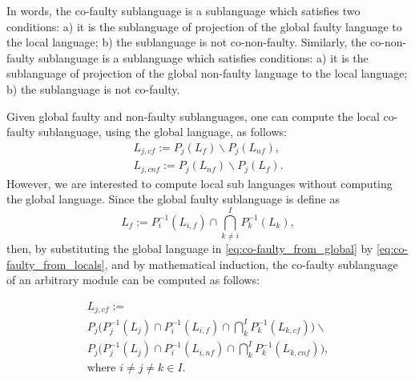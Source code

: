 In words, the co-faulty sublanguage is a sublanguage which satisfies two
conditions:
a) it is the sublanguage of projection of the global faulty language
to the local language; b) the sublanguage is not co-non-faulty.
Similarly, the co-non-faulty sublanguage is a sublanguage which satisfies
conditions:
a) it is the sublanguage of projection of the global non-faulty language
to the local language; b) the sublanguage is not co-faulty.


Given global faulty and non-faulty sublanguages, one can compute the local
co-faulty sublanguage, using the global language, as follows:
\begin{equation}
\label{eq:co-faulty_from_global}
	\begin{array}{l}
		L_{j,cf} := P_j(L_f) \backslash P_j(L_{nf}),\\ 
		L_{j,cnf} := P_j(L_{nf}) \backslash P_j(L_{f}).	
	\end{array}
\end{equation}
However, we are interested to compute local sub languages without computing the
global language. Since the global faulty sublanguage is define as
\begin{equation}
\label{eq:co-faulty_from_locals}
	L_f := P_i^{-1}(L_{i,f}) \cap \bigcap_{k\neq
	i}^I P_k^{-1}(L_k),
\end{equation}
then, by substituting the global language in \ref{eq:co-faulty_from_global} by
\ref{eq:co-faulty_from_locals}, and by mathematical induction, the co-faulty
sublanguage of an arbitrary module can be computed as follows:

\begin{equation}
\label{eq:co-faulty_iterative_w_faulty}
	\begin{array}{l}
		L_{j,cf} := 
		\\
		P_j\Big(P_j^{-1}(L_j) \cap P_i^{-1}(L_{i,f})\cap 
		\bigcap_k^I P_k^{-1}(L_{k,cf})\Big) \backslash 
		\\
		P_j\Big(P_j^{-1}(L_j) \cap P_i^{-1}(L_{i,nf})\cap 
		\bigcap_k^I P_k^{-1}(L_{k,cnf})\Big),
		\\ 
		\textrm{where } i\neq j\neq k \in I.
	\end{array}
\end{equation}

